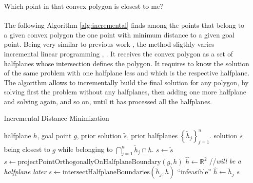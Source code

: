 \documentclass{article}
\begin{document}
{\centering \Large Which point in that convex polygon is closest to me?\\}
~\\
The following Algorithm \ref{alg:incremental} finds among the points that belong to a given convex polygon the one point with minimum distance to a given goal point. Being very similar to previous work \cite{van2011reciprocal}, the method sligthly varies incremental linear programming \cite{seidel1991small}, \cite{van2008computational}.
It receives the convex polygon as a set of halfplanes whose intersection defines the polygon. It requires to know the solution of the same problem with one halfplane less and which is the respective halfplane. The algorithm allows to incrementally build the final solution for any polygon, by solving first the problem without any halfplanes, then adding one more halfplane and solving again, and so on, until it has processed all the halfplanes.
\renewcommand{\algorithmicrequire}{\textbf{Input:}}
\renewcommand{\algorithmicensure}{\textbf{Output:}}
\begin{algorithm}
\caption{Incremental Distance Minimization}
\label{alg:incremental}
\begin{algorithmic}
\REQUIRE 	halfplane $ h $, goal point $ g $, prior solution $\tilde s $, prior halfplanes $ \left\{\tilde h_j\right\}_{j=1}^{n}$.
\ENSURE 	solution $ s $ being closest to $ g $ while belonging to $ \bigcap\limits_{j=1}^{n} \tilde h_j \cap h  $.
\newline
$ s \leftarrow \tilde s $
	\STATE $ s \leftarrow \text{projectPointOrthogonallyOnHalfplaneBoundary}(g, h) $
	\STATE $ \hat h \leftarrow \mathbb{R}^2 $ //\textit{will be a halfplane later}
			\STATE $ s \leftarrow \text{intersectHalfplaneBoundaries}(\tilde h_j, h) $
				\RETURN ``infeasible''
			\ENDIF
			\STATE $ \hat h \leftarrow \tilde h_j $
		\ENDIF
	\ENDFOR
\ENDIF
\RETURN $ s $

\end{algorithmic}
\end{algorithm}



\end{document}
